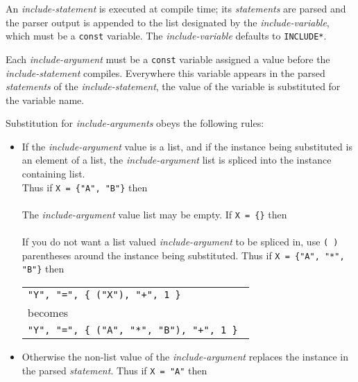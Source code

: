 \documentclass[12pt]{article}
\begin{document}
An {\em include-statement} is executed at compile time;
its {\em statements} are parsed and the parser output is
appended to the list designated by the {\em include-variable},
which must be a {\tt const} variable.  The {\em include-variable}
defaults to {\tt *INCLUDE*}.

Each {\em include-argument} must be a {\tt const} variable assigned
a value before the {\em include-state\-ment} compiles.
Everywhere this variable
appears in the parsed {\em statements} of the {\em include-statement},
the value of the variable is substituted for the variable name.

Substitution for {\em include-arguments} obeys the following rules:
\begin{itemize}
\item \label{INCLUDE-SPLICING} If the {\em include-argument}
value is a list, and if the
instance being substituted is an element of a list,
the {\em include-argument} list is spliced into the instance containing
list.
\\[0.5ex]
Thus if {\tt X = \{"A", "B"\}} then \\
 \\
The {\em include-argument} value list may be empty.
If {\tt X = \{\}} then \\
 \\
If you do not want a list valued {\em include-argument} to be spliced in,
use {\tt (~)} parentheses around the instance being substituted.
Thus if {\tt X = \{"A", "*",  "B"\}} then \\
\hspace*{2em}%
     \begin{tabular}{l}
     \tt "Y", "=", \{ ("X"), "+", 1 \} \\
     becomes \\
     \tt "Y", "=", \{ ("A", "*", "B"), "+", 1 \}
     \end{tabular}

\item Otherwise the non-list value of the {\em include-argument} replaces the
instance in the parsed {\em statement}.
Thus if {\tt X = "A"} then \\
\end{itemize}
\end{document}
